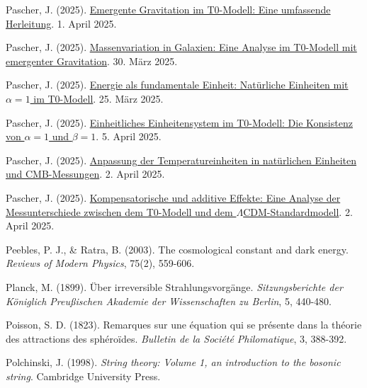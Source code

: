 \documentclass[a4paper,12pt]{article}
\begin{document}
\begin{thebibliography}{99}
		 Pascher, J. (2025). \href{https://github.com/jpascher/T0-Time-Mass-Duality/tree/main/2/pdf/Deutsch/EmergentGravT0.pdf}{Emergente Gravitation im T0-Modell: Eine umfassende Herleitung}. 1. April 2025.
		
		 Pascher, J. (2025). \href{https://github.com/jpascher/T0-Time-Mass-Duality/tree/main/2/pdf/Deutsch/MassVarGalaxien.pdf}{Massenvariation in Galaxien: Eine Analyse im T0-Modell mit emergenter Gravitation}. 30. März 2025.
		
		 Pascher, J. (2025). \href{https://github.com/jpascher/T0-Time-Mass-Duality/tree/main/2/pdf/Deutsch/NatEinheitenAlpha1.pdf}{Energie als fundamentale Einheit: Natürliche Einheiten mit \(\alpha = 1\) im T0-Modell}. 25. März 2025.
		
		 Pascher, J. (2025). \href{https://github.com/jpascher/T0-Time-Mass-Duality/tree/main/2/pdf/Deutsch/Alpha1Beta1Konsistenz.pdf}{Einheitliches Einheitensystem im T0-Modell: Die Konsistenz von \(\alpha = 1\) und \(\beta = 1\)}. 5. April 2025.
		
		 Pascher, J. (2025). \href{https://github.com/jpascher/T0-Time-Mass-Duality/tree/main/2/pdf/Deutsch/TempEinheitenCMB.pdf}{Anpassung der Temperatureinheiten in natürlichen Einheiten und CMB-Messungen}. 2. April 2025.
		
		 Pascher, J. (2025). \href{https://github.com/jpascher/T0-Time-Mass-Duality/tree/main/2/pdf/Deutsch/MessdifferenzenT0Standard.pdf}{Kompensatorische und additive Effekte: Eine Analyse der Messunterschiede zwischen dem T0-Modell und dem \(\Lambda\)CDM-Standardmodell}. 2. April 2025.
		
		 Peebles, P. J., \& Ratra, B. (2003). The cosmological constant and dark energy. \textit{Reviews of Modern Physics}, 75(2), 559-606.
		
		 Planck, M. (1899). Über irreversible Strahlungsvorgänge. \textit{Sitzungsberichte der Königlich Preußischen Akademie der Wissenschaften zu Berlin}, 5, 440-480.
		
		 Poisson, S. D. (1823). Remarques sur une équation qui se présente dans la théorie des attractions des sphéroïdes. \textit{Bulletin de la Société Philomatique}, 3, 388-392.
		
		 Polchinski, J. (1998). \textit{String theory: Volume 1, an introduction to the bosonic string}. Cambridge University Press.
		

\end{thebibliography}
\end{document}
